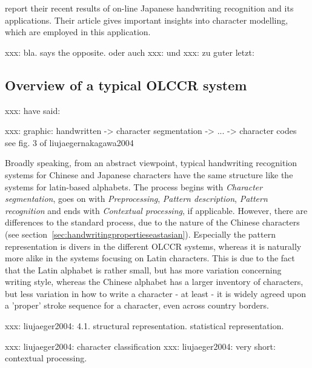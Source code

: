 \cite{Nakagawa2008} report their recent results of on-line Japanese 
handwriting recognition and its applications. Their article gives 
important insights into character modelling, which are employed in 
this application.

xxx: bla.  says the opposite. \cite{ChenLee1996} oder auch 
xxx: \cite{Nakagawa2008} und \cite{Nakai2003} 
xxx: zu guter letzt: \cite{Santosh2009}

\subsection{Overview of a typical OLCCR system}

xxx:  \cite{LiuJaegerNakagawa2004} have said: 

\cite{Keogh2001}
xxx:  graphic:
handwritten -> character segmentation -> ... -> character codes
see fig. 3 of liujaegernakagawa2004

Broadly speaking, from an abstract viewpoint, typical handwriting recognition 
systems for Chinese and Japanese characters have the same structure like the
systems for latin-based alphabets. The process begins with \emph{Character 
segmentation}, goes on with \emph{Preprocessing}, \emph{Pattern description}, 
\emph{Pattern recognition} and ends with \emph{Contextual processing}, 
if applicable. However, there are differences to the standard process, due to 
the nature of the Chinese characters (see 
section~\ref{sec:handwritingpropertieseastasian}).
Especially the pattern representation is divers in the different OLCCR systems,
whereas it is naturally more alike in the systems focusing on Latin characters.
This is due to the fact that the Latin alphabet is rather small, but has more
variation concerning writing style, whereas the Chinese alphabet has a larger 
inventory of characters, but less variation in how to write a character - at
least - it is widely agreed upon a 'proper' stroke sequence for a character,
even across country borders.

xxx: liujaeger2004: 4.1. structural representation. statistical representation.

xxx: liujaeger2004: character classification
xxx: liujaeger2004: very short: contextual processing.




